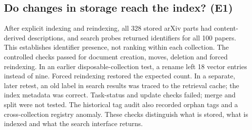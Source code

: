 \subsection{Do changes in storage reach the index? (E1)}
\label{sec:e1}
\label{sec:e2}
After explicit indexing and reindexing, all 328 stored arXiv parts had
content-derived descriptions, and search probes returned identifiers for
all 100 papers. This establishes identifier presence, not ranking within
each collection. The controlled checks passed for document creation, moves,
deletion and forced reindexing. In an earlier disposable-collection test,
a rename left 18 vector entries instead of nine. Forced reindexing restored
the expected count. In a separate, later retest, an old label in search
results was traced to the retrieval cache; the index metadata was correct.
Task-status and update checks failed; merge and split were not tested. The
historical tag audit also recorded orphan tags and a cross-collection
registry anomaly. These checks distinguish what is stored, what is indexed
and what the search interface returns.
